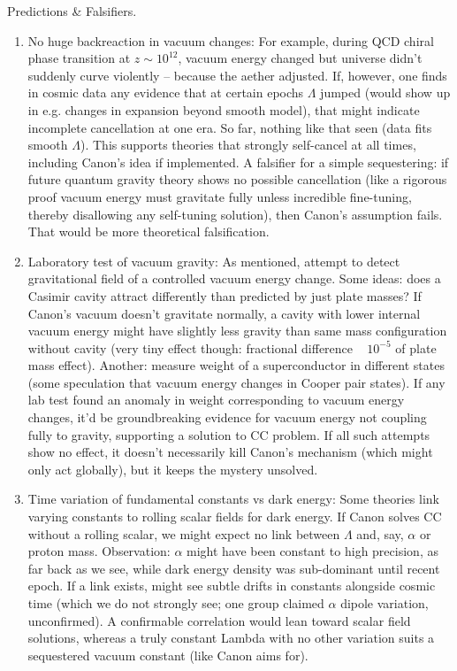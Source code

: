 \documentclass[11pt]{article}
\begin{document}
Predictions & Falsifiers.


\begin{enumerate}

\item 
No huge backreaction in vacuum changes: For example, during QCD chiral phase transition at $z\sim10^{12}$, vacuum energy changed but universe didn’t suddenly curve violently – because the aether adjusted. If, however, one finds in cosmic data any evidence that at certain epochs $\Lambda$ jumped (would show up in e.g. changes in expansion beyond smooth model), that might indicate incomplete cancellation at one era. So far, nothing like that seen (data fits smooth $\Lambda$). This supports theories that strongly self-cancel at all times, including Canon’s idea if implemented. A falsifier for a simple sequestering: if future quantum gravity theory shows no possible cancellation (like a rigorous proof vacuum energy must gravitate fully unless incredible fine-tuning, thereby disallowing any self-tuning solution), then Canon’s assumption fails. That would be more theoretical falsification.




\item 
Laboratory test of vacuum gravity: As mentioned, attempt to detect gravitational field of a controlled vacuum energy change. Some ideas: does a Casimir cavity attract differently than predicted by just plate masses? If Canon’s vacuum doesn’t gravitate normally, a cavity with lower internal vacuum energy might have slightly less gravity than same mass configuration without cavity (very tiny effect though: fractional difference ~ $10^{-5}$ of plate mass effect). Another: measure weight of a superconductor in different states (some speculation that vacuum energy changes in Cooper pair states). If any lab test found an anomaly in weight corresponding to vacuum energy changes, it’d be groundbreaking evidence for vacuum energy not coupling fully to gravity, supporting a solution to CC problem. If all such attempts show no effect, it doesn’t necessarily kill Canon’s mechanism (which might only act globally), but it keeps the mystery unsolved.




\item 
Time variation of fundamental constants vs dark energy: Some theories link varying constants to rolling scalar fields for dark energy. If Canon solves CC without a rolling scalar, we might expect no link between $\Lambda$ and, say, $\alpha$ or proton mass. Observation: $\alpha$ might have been constant to high precision, as far back as we see, while dark energy density was sub-dominant until recent epoch. If a link exists, might see subtle drifts in constants alongside cosmic time (which we do not strongly see; one group claimed $\alpha$ dipole variation, unconfirmed). A confirmable correlation would lean toward scalar field solutions, whereas a truly constant Lambda with no other variation suits a sequestered vacuum constant (like Canon aims for).





\end{enumerate}
\end{document}

